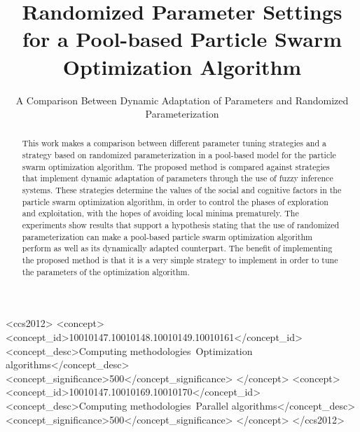 \documentclass[sigconf]{acmart}
\begin{document}


\title{Randomized Parameter Settings for a Pool-based Particle Swarm Optimization Algorithm}
\subtitle{A Comparison Between Dynamic Adaptation of Parameters and Randomized Parameterization}






\begin{abstract}
This work makes a comparison between different parameter tuning strategies and a strategy based on randomized parameterization in a pool-based model for the particle swarm optimization algorithm. The proposed method is compared against strategies that implement dynamic adaptation of parameters through the use of fuzzy inference systems. These strategies determine the values of the social and cognitive factors in the particle swarm optimization algorithm, in order to control the phases of exploration and exploitation, with the hopes of avoiding local minima prematurely. The experiments show results that support a hypothesis stating that the use of randomized parameterization can make a pool-based particle swarm optimization algorithm perform as well as its dynamically adapted counterpart. The benefit of implementing the proposed method is that it is a very simple strategy to implement in order to tune the parameters of the optimization algorithm.
\end{abstract}

%
%
 \begin{CCSXML}
<ccs2012>
<concept>
<concept_id>10010147.10010148.10010149.10010161</concept_id>
<concept_desc>Computing methodologies~Optimization algorithms</concept_desc>
<concept_significance>500</concept_significance>
</concept>
<concept>
<concept_id>10010147.10010169.10010170</concept_id>
<concept_desc>Computing methodologies~Parallel algorithms</concept_desc>
<concept_significance>500</concept_significance>
</concept>
</ccs2012>
\end{CCSXML}
\end{document}
